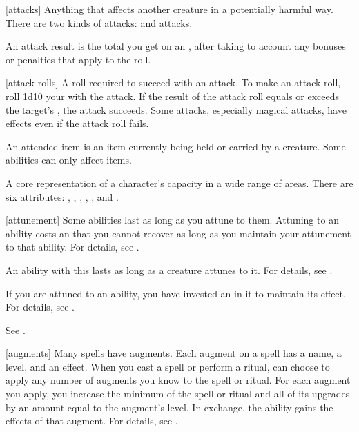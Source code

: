 [attacks] Anything that affects another creature in a potentially harmful way. There are two kinds of attacks:  and  attacks.

 An attack result is the total you get on an , after taking to account any bonuses or penalties that apply to the roll.

[attack rolls] A roll required to succeed with an attack.
To make an attack roll, roll 1d10 \add your  with the attack.
If the result of the attack roll equals or exceeds the target's , the attack succeeds.
Some attacks, especially magical attacks, have effects even if the attack roll fails.

 An attended item is an item currently being held or carried by a creature.
Some abilities can only affect  items.

 A core representation of a character's capacity in a wide range of areas. There are six attributes: , , , , , and .

[attunement] Some abilities last as long as you attune to them.
Attuning to an ability costs an  that you cannot recover as long as you maintain your attunement to that ability.
For details, see .

 An ability with this  lasts as long as a creature attunes to it.
For details, see .

 If you are attuned to an ability, you have invested an  in it to maintain its effect.
For details, see .

 See .

[augments] Many spells have augments.
Each augment on a spell has a name, a level, and an effect.
When you cast a spell or perform a ritual, can choose to apply any number of augments you know to the spell or ritual.
For each augment you apply, you increase the minimum  of the spell or ritual and all of its upgrades by an amount equal to the augment's level.
In exchange, the ability gains the effects of that augment.
For details, see .

